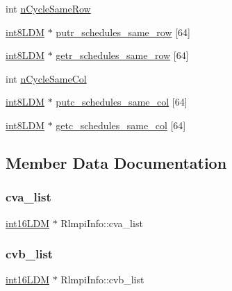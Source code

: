 \begin{DoxyCompactItemize}
\item 
int \mbox{\hyperlink{structRlmpiInfo_a9ad84098c9501064a21714fe18a73c49}{n\+Cycle\+Same\+Row}}
\item 
\mbox{\hyperlink{include_2RlmpiShared_8h_a69782ffde89d45e86308f10afedf08a6}{int8\+L\+DM}} $\ast$ \mbox{\hyperlink{structRlmpiInfo_a3b6eb0a23eb6e0cdc3781acd78148962}{putr\+\_\+schedules\+\_\+same\+\_\+row}} \mbox{[}64\mbox{]}
\item 
\mbox{\hyperlink{include_2RlmpiShared_8h_a69782ffde89d45e86308f10afedf08a6}{int8\+L\+DM}} $\ast$ \mbox{\hyperlink{structRlmpiInfo_afe776511dd4d7aabb1c6c3b83f4bd5bf}{getr\+\_\+schedules\+\_\+same\+\_\+row}} \mbox{[}64\mbox{]}
\item 
int \mbox{\hyperlink{structRlmpiInfo_adbdf32fe798513273ecd1a2ce426ba9f}{n\+Cycle\+Same\+Col}}
\item 
\mbox{\hyperlink{include_2RlmpiShared_8h_a69782ffde89d45e86308f10afedf08a6}{int8\+L\+DM}} $\ast$ \mbox{\hyperlink{structRlmpiInfo_abb4c8c29f51a38bf64e4e947e2e1c2fa}{putc\+\_\+schedules\+\_\+same\+\_\+col}} \mbox{[}64\mbox{]}
\item 
\mbox{\hyperlink{include_2RlmpiShared_8h_a69782ffde89d45e86308f10afedf08a6}{int8\+L\+DM}} $\ast$ \mbox{\hyperlink{structRlmpiInfo_a591af1c72cf5b3d7501dfdde0ce34ec2}{getc\+\_\+schedules\+\_\+same\+\_\+col}} \mbox{[}64\mbox{]}
\end{DoxyCompactItemize}


\subsection{Member Data Documentation}
\mbox{\label{structRlmpiInfo_a2d9a408cbf2d67edc38a187347b24782}} 
\subsubsection{\texorpdfstring{cva\_list}{cva\_list}}
{\footnotesize\ttfamily \mbox{\hyperlink{include_2RlmpiShared_8h_a692aa037341791e306174d4669707b03}{int16\+L\+DM}} $\ast$ Rlmpi\+Info\+::cva\+\_\+list}

\mbox{\label{structRlmpiInfo_abc0947523e956b84bb6706bd3d81d6aa}} 
\subsubsection{\texorpdfstring{cvb\_list}{cvb\_list}}
{\footnotesize\ttfamily \mbox{\hyperlink{include_2RlmpiShared_8h_a692aa037341791e306174d4669707b03}{int16\+L\+DM}} $\ast$ Rlmpi\+Info\+::cvb\+\_\+list}

